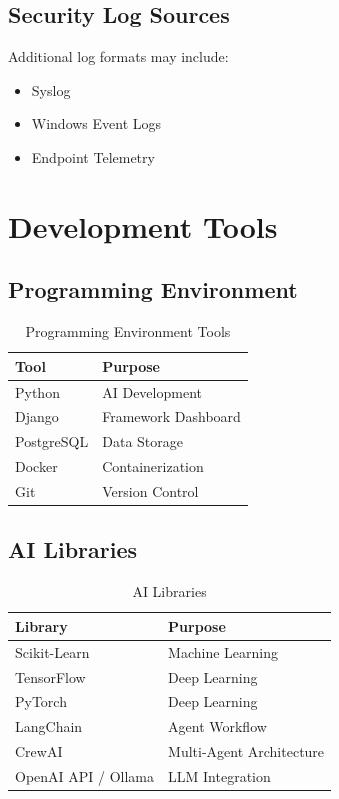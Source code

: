 \documentclass[12pt,a4paper]{report}
\begin{document}
\subsection{Security Log Sources}
Additional log formats may include:
\begin{itemize}
    \item Syslog
    \item Windows Event Logs
    \item Endpoint Telemetry
\end{itemize}

\section{Development Tools}
\label{sec:dev_tools}

\subsection{Programming Environment}

\begin{table}[h!]
\centering
\caption{Programming Environment Tools}
\label{tab:prog_env}
\begin{tabularx}{\textwidth}{|l|X|}
\hline
\textbf{Tool} & \textbf{Purpose} \\
\hline
Python & AI Development \\
\hline
Django & Framework Dashboard \\
\hline
PostgreSQL & Data Storage \\
\hline
Docker & Containerization \\
\hline
Git & Version Control \\
\hline
\end{tabularx}
\end{table}

\subsection{AI Libraries}

\begin{table}[h!]
\centering
\caption{AI Libraries}
\label{tab:ai_libs}
\begin{tabularx}{\textwidth}{|l|X|}
\hline
\textbf{Library} & \textbf{Purpose} \\
\hline
Scikit-Learn & Machine Learning \\
\hline
TensorFlow & Deep Learning \\
\hline
PyTorch & Deep Learning \\
\hline
LangChain & Agent Workflow \\
\hline
CrewAI & Multi-Agent Architecture \\
\hline
OpenAI API / Ollama & LLM Integration \\
\hline
\end{tabularx}
\end{table}
\end{document}
